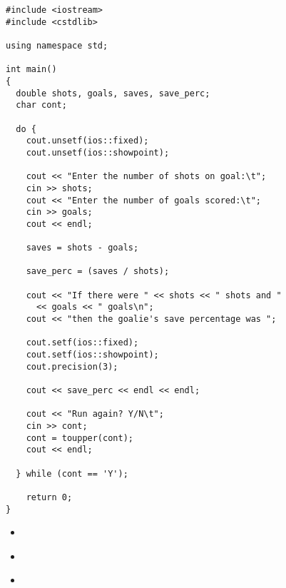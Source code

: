 \begin{enumerate}
\noindent\begin{minipage}{\linewidth}\begin{lstlisting}
#include <iostream>
#include <cstdlib>

using namespace std;

int main()
{
  double shots, goals, saves, save_perc;
  char cont;

  do {
    cout.unsetf(ios::fixed);
    cout.unsetf(ios::showpoint);

    cout << "Enter the number of shots on goal:\t";
    cin >> shots;
    cout << "Enter the number of goals scored:\t";
    cin >> goals;
    cout << endl;

    saves = shots - goals;

    save_perc = (saves / shots);

    cout << "If there were " << shots << " shots and " 
      << goals << " goals\n";
    cout << "then the goalie's save percentage was ";

    cout.setf(ios::fixed);
    cout.setf(ios::showpoint);
    cout.precision(3);

    cout << save_perc << endl << endl;

    cout << "Run again? Y/N\t";
    cin >> cont;
    cont = toupper(cont);
    cout << endl;

  } while (cont == 'Y');

    return 0;
}
\end{lstlisting}\end{minipage}

\end{enumerate}


\begin{itemize}
\item ~
\item ~
\item ~
\end{itemize}	

